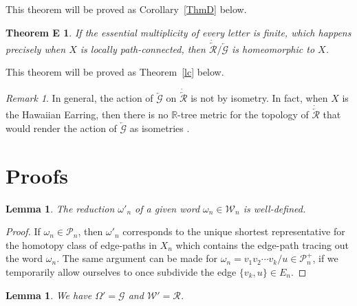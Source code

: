 \documentclass{amsart}
\newtheorem{lemma}[theorem]{Lemma}
\newtheorem*{TheoremE}{Theorem E}
\theoremstyle{definition}
\theoremstyle{remark}
\newtheorem{remark}[theorem]{Remark}
\numberwithin{equation}{section}
\begin{document}
 This theorem will be proved as Corollary~\ref{ThmD} below.

\begin{TheoremE}
 If the essential multiplicity of every letter is finite, which happens precisely when $X$ is locally path-connected, then $\dot{\overleftarrow{\mathcal R}}/\overleftarrow{\mathcal G}$ is homeomorphic to $X$.
\end{TheoremE}

 This theorem will be proved as Theorem~\ref{lc} below.

\begin{remark}\label{noiso}
In general, the action of $\overleftarrow{\mathcal G}$ on $\dot{\overleftarrow{\mathcal R}}$ is not by isometry. In fact, when $X$ is the Hawaiian Earring, then there is no $\mathbb{R}$-tree metric for the topology of $\dot{\overleftarrow{\mathcal R}}$ that would render the action of $\overleftarrow{\mathcal G}$ as isometries \cite[Example~4.15]{FZ2}.
\end{remark}

\section{Proofs}

\begin{lemma}\label{reduction}
The reduction $\omega'_n$ of a given word $\omega_n\in {\mathcal W}_n$ is well-defined.
\end{lemma}

\begin{proof} If $\omega_n\in {\mathcal P}_n$, then
  $\omega'_n$ corresponds to the unique shortest representative for the homotopy class of edge-paths in $X_n$ which contains the edge-path tracing out the word $\omega_n$. The same argument can be made for $\omega_n=v_1v_2\cdots v_k/u\in {\mathcal P}^+_n$, if we temporarily allow ourselves to once subdivide the edge $\{v_k,u\}\in E_n$.
\end{proof}

\begin{lemma}\label{setequal}
We have  $\Omega'={\mathcal G}$ and ${\mathcal W}'={\mathcal R}$.
\end{lemma}
\end{document}

